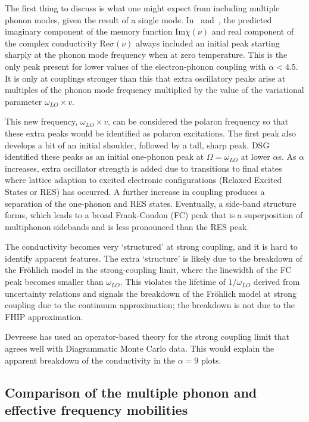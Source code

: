 The first thing to discuss is what one might expect from including multiple phonon modes, given the result of a single mode. In~\cite{feynman_mobility_1962} and~\cite{devreese_optical_1972}, the predicted imaginary component of the memory function $\text{Im}\chi(\nu)$ and real component of the complex conductivity $\text{Re}\sigma(\nu)$ always included an initial peak starting sharply at the phonon mode frequency when at zero temperature. This is the only peak present for lower values of the electron-phonon coupling with $\alpha < 4.5$. It is only at couplings stronger than this that extra oscillatory peaks arise at multiples of the phonon mode frequency multiplied by the value of the variational parameter $\omega_{LO} \times v$. 

This new frequency, $\omega_{LO} \times v$, can be considered the polaron frequency so that these extra peaks would be identified as polaron excitations. The first peak also develops a bit of an initial shoulder, followed by a tall, sharp peak. DSG identified these peaks as an initial one-phonon peak at $\Omega = \omega_{LO}$ at lower $\alpha$s. As $\alpha$ increases, extra oscillator strength is added due to transitions to final states where lattice adaption to excited electronic configurations (Relaxed Excited States or RES) has occurred. A further increase in coupling produces a separation of the one-phonon and RES states. Eventually, a side-band structure forms, which leads to a broad Frank-Condon (FC) peak that is a superposition of multiphonon sidebands and is less pronounced than the RES peak. 

The conductivity becomes very `structured' at strong coupling, and it is hard to identify apparent features. The extra `structure' is likely due to the breakdown of the Fr\"ohlich model in the strong-coupling limit, where the linewidth of the FC peak becomes smaller than $\omega_{LO}$. This violates the lifetime of $1 / \omega_{LO}$ derived from uncertainty relations and signals the breakdown of the Fr\"ohlich model at strong coupling due to the continuum approximation; the breakdown is not due to the FHIP approximation. 

Devreese has used an operator-based theory \cite{Devreese2001} for the strong coupling limit that agrees well with Diagrammatic Monte Carlo data. This would explain the apparent breakdown of the conductivity in the $\alpha = 9$ plots. 

\subsection{Comparison of the multiple phonon and effective frequency mobilities}


